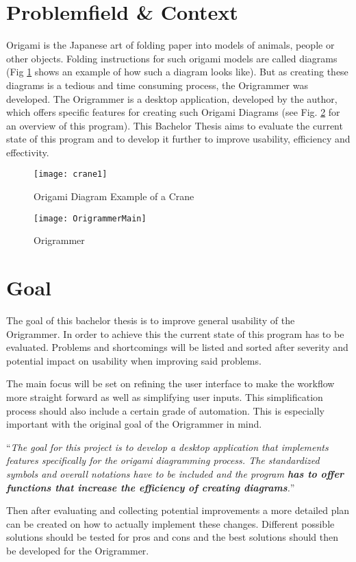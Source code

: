 
\section{Problemfield \& Context}

Origami is the Japanese art of folding paper into models of animals, people or other objects. Folding instructions for such origami models are called diagrams (Fig \ref{fig:cranediagram} shows an example of how such a diagram looks like). But as creating these diagrams is a tedious and time consuming process, the Origrammer \cite{origrammer} was developed. The Origrammer is a desktop application, developed by the author, which offers specific features for creating such Origami Diagrams (see Fig. \ref{fig:origrammerMain} for an overview of this program).
This Bachelor Thesis aims to evaluate the current state of this program and to develop it further to improve usability, efficiency and effectivity.

\begin{figure}[h]
\centering
\texttt{[image: crane1]}
\caption{Origami Diagram Example of a Crane}
\label{fig:cranediagram}
\end{figure}


\begin{figure}[h]
\centering
\texttt{[image: OrigrammerMain]}
\caption{Origrammer}
\label{fig:origrammerMain}
\end{figure}

\newpage

\section{Goal}
The goal of this bachelor thesis is to improve general usability of the Origrammer. In order to achieve this the current state of this program has to be evaluated. Problems and shortcomings will be listed and sorted after severity and potential impact on usability when improving said problems.

The main focus will be set on refining the user interface to make the workflow more straight forward as well as simplifying user inputs. This simplification process should also include a certain grade of automation. This is especially important with the original goal of the Origrammer in mind.
\begin{center}
\enquote{\emph{The goal for this project is to develop a desktop application that implements features specifically for the origami diagramming process. The standardized symbols and overall notations have to be included and the program \textbf{has to offer functions that increase the efficiency of creating diagrams}.}} \cite{origrammer}
\end{center}
Then after evaluating and collecting potential improvements a more detailed plan can be created on how to actually implement these changes. Different possible solutions should be tested for pros and cons and the best solutions should then be developed for the Origrammer.


